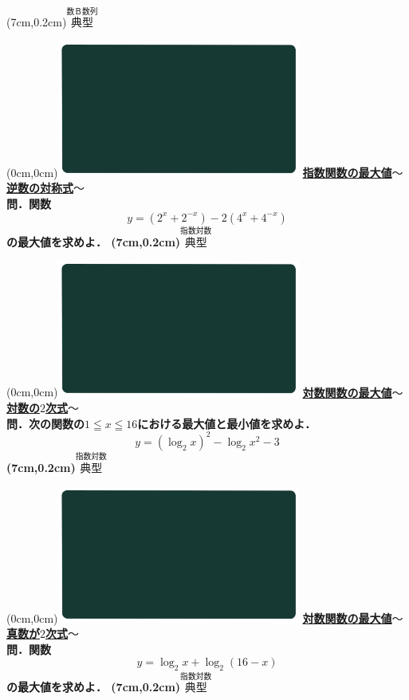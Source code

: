 \documentclass[10pt,
fleqn,
dvipdfmx,
uplatex
]{jsarticle}
\begin{document}
\at(7cm,0.2cm){\small\color{bradorange}$\overset{\text{数Ｂ数列}}{\text{典型}}$}

\newpage



\at(0cm,0cm){\includegraphics[width=8cm,bb=0 0 1920 1080]{./youtube/thumbnails/templates/smart_background/指数対数.jpeg}}
{\color{orange}\bf\boldmath\large\underline{指数関数の最大値$〜$逆数の対称式$〜$}}\vspace{0.3zw}\\
\LARGE 
\bf\boldmath 問．関数
\Large
\[ y=\left(2^x+2^{-x}\right)-2\left(4^x+4^{-x}\right)\]
\LARGE
の最大値を求めよ．
\at(7cm,0.2cm){\small\color{bradorange}$\overset{\text{指数対数}}{\text{典型}}$}

\newpage

\at(0cm,0cm){\includegraphics[width=8cm,bb=0 0 1920 1080]{./youtube/thumbnails/templates/smart_background/指数対数.jpeg}}
{\color{orange}\bf\boldmath\large\underline{対数関数の最大値$〜$対数の$2$次式$〜$}}\vspace{0.3zw}\\
\Large 
\bf\boldmath 問．次の関数の$1\leqq x\leqq {16}$における最大値と最小値を求めよ．
\[y=\left(\log _2x\right)^2-\log _2x^2-3\]
\at(7cm,0.2cm){\small\color{bradorange}$\overset{\text{指数対数}}{\text{典型}}$}

\newpage

\at(0cm,0cm){\includegraphics[width=8cm,bb=0 0 1920 1080]{./youtube/thumbnails/templates/smart_background/指数対数.jpeg}}
{\color{orange}\bf\boldmath\large\underline{対数関数の最大値$〜$真数が$2$次式$〜$}}\vspace{0.3zw}\\
\LARGE  
\bf\boldmath 問．関数
\Large
\[y=\log _2x+\log _2\left({16}-x\right)\]
\LARGE  
の最大値を求めよ．
\at(7cm,0.2cm){\small\color{bradorange}$\overset{\text{指数対数}}{\text{典型}}$}
\end{document}
